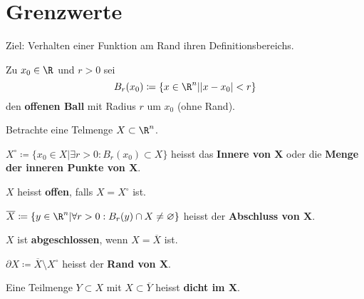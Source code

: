 \chapter{Grenzwerte}
Ziel: Verhalten einer Funktion am Rand ihren Definitionsbereichs.\\
\begin{def*}[note = offener Ball , index = offener Ball]
	Zu $x_0 \in \R$ und $r > 0$ sei
	\[ B_r(x_0) \coloneqq \{ x \in \R^n | \abs{x-x_0} < r \} \]
	den \textbf{offenen Ball} mit Radius $r$ um $x_0$ (ohne Rand).
\end{def*}

Betrachte eine Telmenge $X \subset \R^n$.\\
\begin{def*}[note = Innere , index = Innere]
	$X^\circ \coloneqq \{ x_0 \in X | \exists r > 0 : B_r(x_0) \subset X\}$ heisst das \textbf{Innere von $\mathbf{X}$} oder die \textbf{Menge der inneren Punkte von $\mathbf{X}$}.
\end{def*}
\begin{def*}[note = offen , index = offen]
	$X$ heisst \textbf{offen}, falls $X = X^\circ$ ist.
\end{def*}
\begin{def*}[note = Abschluss , index = Abschluss]
	$\overline{X} \coloneqq \{ y \in \R^n | \forall r > 0 : B_r(y) \cap X \neq \varnothing \}$ heisst der \textbf{Abschluss von $\mathbf{X}$}.
\end{def*}
\begin{def*}[note = abgeschlossen , index = abgeschlossen]
	$X$ ist \textbf{abgeschlossen}, wenn $X = \overline{X}$ ist.
\end{def*}
\begin{def*}[note = Rand , index = Rand]
	$\partial X \coloneqq \overline{X} \setminus X^\circ$ heisst der \textbf{Rand von $\mathbf{X}$}.
\end{def*}
\begin{def*}[note = dicht , index = dicht]
	Eine Teilmenge $Y \subset X$ mit $X \subset \overline{Y}$ heisst \textbf{dicht im $\mathbf{X}$}.
\end{def*}
